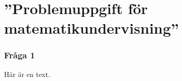 \part{''Problemuppgift för matematikundervisning''}

\setcounter{section}{0}
\section{Fråga 1}
Här är en text.